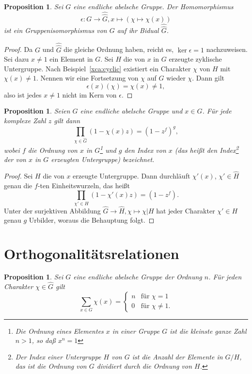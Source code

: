 \documentclass[a4paper,twoside,openright]{report}
\newtheorem{prop}[thm]{Proposition}
\theoremstyle{definition}
\theoremstyle{remark}
\begin{document}
\begin{prop}
  Sei $G$ eine endliche abelsche Gruppe.
  Der Homomorphismus
  \[
    \epsilon\colon G \to \hat{\hat G}, x \mapsto (\chi \mapsto \chi(x))
  \]
  ist ein Gruppenisomorphismus von $G$ auf ihr \emph{Bidual $\hat{\hat G}$}.
\end{prop}

\begin{proof}
  Da $G$ und $\hat{\hat G}$ die gleiche Ordnung haben, reicht es, $\ker \epsilon = 1$
  nachzuweisen. Sei dazu $x \neq 1$ ein Element in $G$. Sei $H$ die von $x$ in $G$
  erzeugte zyklische Untergruppe. Nach Beispiel~\ref{xca:cyclic} existiert ein Charakter
  $\chi$ von $H$ mit $\chi(x) \neq 1$. Nennen wir eine Fortsetzung von $\chi$ auf $G$
  wieder $\chi$. Dann gilt
  \[
    \epsilon(x)(\chi) = \chi(x) \neq 1,
  \] 
  also ist jedes $x \neq 1$ nicht im Kern von $\epsilon$.
\end{proof}

\begin{prop}
  \label{prop:character}
  Seien $G$ eine endliche abelsche Gruppe und $x \in G$. Für jede komplexe
  Zahl $z$ gilt dann
  \[
    \prod_{\chi \in \hat G} (1 - \chi(x) z) = (1 - z^f)^g,
  \]
  wobei $f$ die Ordnung von $x$ in $G$\footnote{Die \emph{Ordnung} eines Elementes $x$ in einer Gruppe
  $G$ ist die kleinste ganze Zahl $n > 1$, so daß $x^n = 1$} und $g$ den Index von $x$ (das heißt
  den Index\footnote{Der \emph{Index} einer Untergruppe $H$ von $G$ ist die Anzahl der Elemente in
  $G/H$, das ist die Ordnung von $G$ dividiert durch die Ordnung von $H$.}
  der von $x$ in $G$ erzeugten Untergruppe) bezeichnet.
\end{prop}

\begin{proof}
  Sei $H$ die von $x$ erzeugte Untergruppe. Dann durchläuft $\chi'(x)$, $\chi' \in \hat H$
  genau die $f$-ten Einheitswurzeln, das heißt
  \[
    \prod_{\chi' \in H} (1 - \chi'(x) z) = (1 - z^f).
  \]
  Unter der surjektiven Abbildung $\hat G \to \hat H, \chi \mapsto \chi|H$ hat
  jeder Charakter $\chi' \in H$ genau $g$ Urbilder, woraus die Behauptung folgt.
\end{proof}

\section{Orthogonalitätsrelationen}

\begin{prop}
  Sei $G$ eine endliche abelsche Gruppe der Ordnung $n$. Für jeden Charakter $\chi \in \hat G$
  gilt
  \[
    \sum_{x \in G} \chi(x) = \begin{cases}
      n & \text{für $\chi = 1$} \\
      0 & \text{für $\chi \neq 1$}.
    \end{cases}
  \]  
\end{prop}
\end{document}
